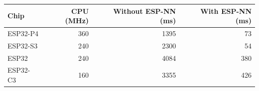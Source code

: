 \begin{tabular}{lrrr}
\toprule
Chip & CPU (MHz) & Without ESP-NN (ms) & With ESP-NN (ms) \\
\midrule
ESP32-P4 & 360 & 1395 & 73 \\
ESP32-S3 & 240 & 2300 & 54 \\
ESP32 & 240 & 4084 & 380 \\
ESP32-C3 & 160 & 3355 & 426 \\
\bottomrule
\end{tabular}